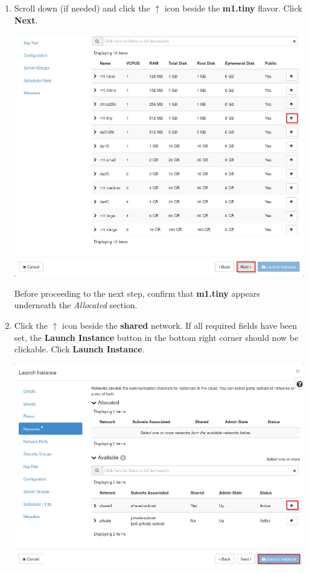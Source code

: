 \documentclass[letterpaper, 12pt]{article}
\begin{document}
\begin{enumerate}
    \item Scroll down (if needed) and click the $\uparrow$ icon beside the \textbf{m1.tiny} flavor. Click \textbf{Next}.
    
    \begin{center}
        \includegraphics[width=\linewidth]{images/part1/step12.png}
    \end{center}

    \begin{stopbox}{}
        Before proceeding to the next step, confirm that \textbf{m1.tiny} appears underneath the \textit{Allocated}
        section.
    \end{stopbox}

    \item Click the $\uparrow$ icon beside the \textbf{shared} network. If all required fields have been set, the
    \textbf{Launch Instance} button in the bottom right corner should now be clickable. Click \textbf{Launch Instance}.

    \begin{center}
        \includegraphics[width=\linewidth]{images/part1/step13.png}
    \end{center}


\end{enumerate}
\end{document}
